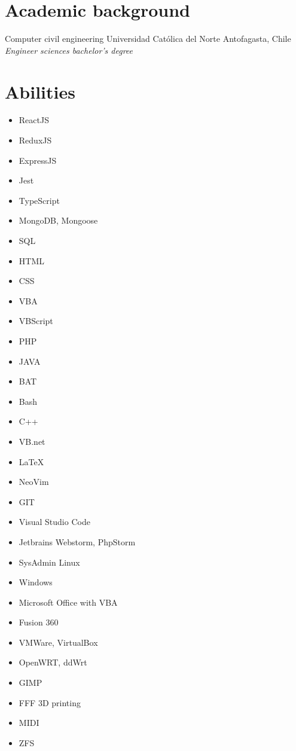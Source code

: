\documentclass[draft,color,12pt,letterpaper,sans]{moderncv}
\begin{document}
\section{Academic background}
{Computer civil engineering}
{Universidad Cat\'olica del Norte}
{Antofagasta, Chile}
{\textit{Engineer sciences bachelor's degree}}
{}

\newpage

\section{Abilities}
\begin{cvcolumns}
	{
		\begin{itemize}
			\item
				ReactJS
			\item
				ReduxJS
			\item
				ExpressJS
			\item
				Jest
			\item
				TypeScript
			\item
				MongoDB, Mongoose
			\item
				SQL
			\item
				HTML
			\item
				CSS
			\item
				VBA
			\item	
				VBScript
			\item
				PHP
			\item
				JAVA
			\item
				BAT
			\item
				Bash
			\item
				C++
			\item
				VB.net
			\item
				LaTeX
		\end{itemize}
	}
	

{
	\begin{itemize}
		\item	
			NeoVim
    \item
			GIT
		\item
			Visual Studio Code
		\item
			Jetbrains Webstorm, PhpStorm
		\item
			SysAdmin Linux
		\item
			Windows
		\item
			Microsoft Office with VBA
		\item
			Fusion 360
		\item
			VMWare, VirtualBox
		\item
			OpenWRT, ddWrt
		\item
			GIMP
		\item
			FFF 3D printing
		\item
			MIDI
		\item
			ZFS
		\end{itemize}
}

\end{cvcolumns}
\end{document}
